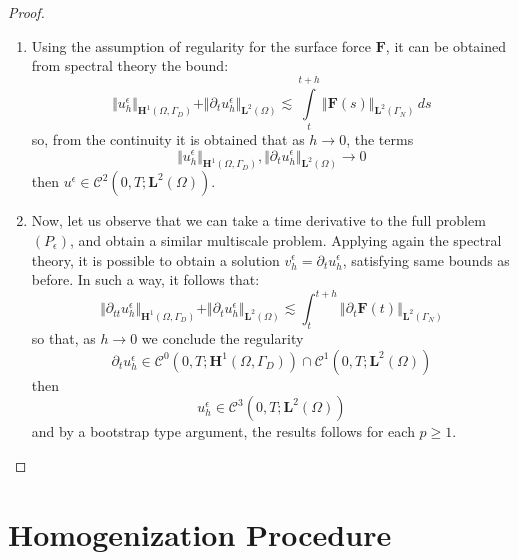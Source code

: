 \begin{proof}
\begin{enumerate}
    \item Using the assumption of regularity for the surface force $\mathbf{F}$, it can be obtained from spectral theory the bound:
    \begin{equation*}
        \Vert u_h^{\epsilon} \Vert_{\mathbf{H}^1(\Omega, \Gamma_D)} + \Vert \partial_t u_h^{\epsilon}\Vert_{\mathbf{L}^2(\Omega)} \lesssim \int \limits_t^{t+h} \Vert \mathbf{F}(s) \Vert_{\mathbf{L}^2(\Gamma_N)} \, ds
    \end{equation*}
    so, from the continuity it is obtained that as $h \rightarrow 0$, the terms 
    \begin{equation*}
        \Vert u_h^{\epsilon} \Vert_{\mathbf{H}^1(\Omega, \Gamma_D)}, \Vert \partial_t u_h^{\epsilon} \Vert_{\mathbf{L}^2 (\Omega)} \rightarrow 0
    \end{equation*}
    then $u^{\epsilon} \in \mathcal{C}^2(0,T; \mathbf{L}^2(\Omega))$.
    
    
    \item Now, let us observe that we can take a time derivative to the full problem $(P_{\epsilon})$, and obtain a similar multiscale problem. Applying again the spectral theory, it is possible to obtain a solution $v_h^{\epsilon} = \partial_t u_h^{\epsilon}$, satisfying same bounds as before. In such a way, it follows that:
    \begin{equation*}
        \Vert \partial_{tt} u_h^{\epsilon} \Vert_{\mathbf{H}^1(\Omega, \Gamma_D)} + \Vert \partial_t u_h^{\epsilon} \Vert_{\mathbf{L}^2 (\Omega)} \lesssim \int_t^{t+h} \Vert \partial_t \mathbf{F}(t) \Vert_{\mathbf{L}^2(\Gamma_N)}
    \end{equation*}
    so that, as $h \rightarrow 0$ we conclude the regularity
    \begin{equation*}
        \partial_t u_h^{\epsilon} \in \mathcal{C}^0(0,T;\mathbf{H}^1(\Omega, \Gamma_D)) \cap \mathcal{C}^1(0,T;\mathbf{L}^2(\Omega)) 
    \end{equation*}
    then
    \begin{equation*}
        u_h^{\epsilon} \in \mathcal{C}^3(0,T; \mathbf{L}^2(\Omega))
    \end{equation*}
    and by a bootstrap type argument, the results follows for each $p \geq 1$.
\end{enumerate}

\end{proof}



\section{Homogenization Procedure}

